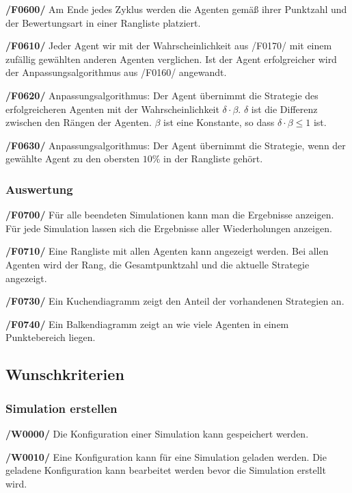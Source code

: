 \textbf{/F0600/}
Am Ende jedes Zyklus werden die Agenten gemäß ihrer Punktzahl und der Bewertungsart in einer Rangliste platziert.

\textbf{/F0610/}
Jeder Agent wir mit der Wahrscheinlichkeit aus /F0170/ mit einem zufällig gewählten anderen Agenten verglichen. Ist der Agent erfolgreicher wird der Anpassungsalgorithmus aus /F0160/ angewandt.

\textbf{/F0620/}
Anpassungsalgorithmus: Der Agent übernimmt die Strategie des erfolgreicheren Agenten mit der Wahrscheinlichkeit $\delta \cdot \beta$. $\delta$ ist die Differenz zwischen den Rängen der Agenten. $\beta$ ist eine Konstante, so dass $\delta \cdot \beta \leq 1$ ist.

\textbf{/F0630/}
Anpassungsalgorithmus: Der Agent übernimmt die Strategie, wenn der gewählte Agent zu den obersten $10\%$ in der Rangliste gehört.

\subsubsection{Auswertung}

\textbf{/F0700/}
Für alle beendeten Simulationen kann man die Ergebnisse anzeigen. Für jede Simulation lassen sich die Ergebnisse aller Wiederholungen anzeigen.

\textbf{/F0710/}
Eine Rangliste mit allen Agenten kann angezeigt werden. Bei allen Agenten wird der Rang, die Gesamtpunktzahl und die aktuelle Strategie angezeigt.

\textbf{/F0730/}
Ein Kuchendiagramm zeigt den Anteil der vorhandenen Strategien an.

\textbf{/F0740/}
Ein Balkendiagramm zeigt an wie viele Agenten in einem Punktebereich liegen. 

\subsection{Wunschkriterien}

\subsubsection{Simulation erstellen}

\textbf{/W0000/}
Die Konfiguration einer Simulation kann gespeichert werden.

\textbf{/W0010/}
Eine Konfiguration kann für eine Simulation geladen werden. Die geladene Konfiguration kann bearbeitet werden bevor die Simulation erstellt wird.

